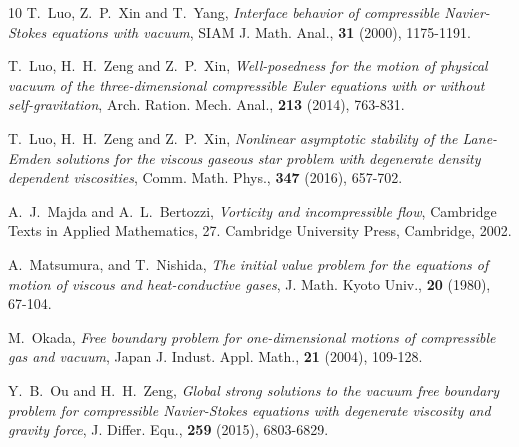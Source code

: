 \documentclass[11pt, reqno]{amsart}
\numberwithin{equation}{section}
\begin{document}
{\begin{thebibliography}{10}
{\sc T.~Luo, Z.~P.~Xin and T.~Yang}, {\em Interface behavior of compressible Navier-Stokes equations with vacuum}, SIAM J. Math. Anal., {\bf 31} (2000), 1175-1191.


{\sc T.~Luo, H.~H.~Zeng and Z.~P.~Xin}, {\em Well-posedness for the motion of physical vacuum of the three-dimensional compressible Euler equations with or without self-gravitation}, Arch. Ration. Mech. Anal., {\bf 213} (2014), 763-831.

{\sc T.~Luo, H.~H.~Zeng and Z.~P.~Xin}, {\em Nonlinear asymptotic stability of the Lane-Emden solutions for the viscous gaseous star problem with degenerate density dependent viscosities}, Comm. Math. Phys., {\bf 347} (2016), 657-702.

{\sc A.~J.~Majda and A.~L.~Bertozzi}, {\em Vorticity and incompressible flow}, Cambridge Texts in Applied Mathematics, 27. Cambridge University Press, Cambridge, 2002.


{\sc A.~Matsumura, and T.~Nishida}, {\em The initial value problem for the equations of motion of viscous and heat-conductive gases}, J. Math. Kyoto Univ., {\bf 20} (1980), 67-104.



{\sc M.~Okada}, {\em Free boundary problem for one-dimensional motions of compressible gas and vacuum}, Japan J. Indust. Appl. Math., {\bf 21} (2004), 109-128.




{\sc Y.~B.~Ou and H.~H.~Zeng}, {\em Global strong solutions to the vacuum free boundary problem for compressible Navier-Stokes equations with degenerate viscosity and gravity force},  J. Differ. Equ., {\bf 259} (2015), 6803-6829.


	

\end{thebibliography}}
\end{document}
